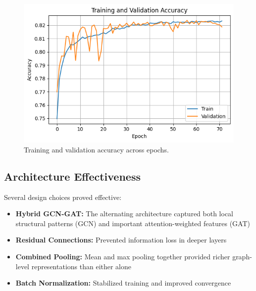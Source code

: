 \begin{figure}[t]
	\centering
	\includegraphics[width=\linewidth]{../model/logs/training_accuracy.png}
	\caption{Training and validation accuracy across epochs.}
	\label{fig:training-accuracy}
\end{figure}

\subsection{Architecture Effectiveness}

Several design choices proved effective:
\begin{itemize}
\item \textbf{Hybrid GCN-GAT:} The alternating architecture captured both local structural patterns (GCN) and important attention-weighted features (GAT)
\item \textbf{Residual Connections:} Prevented information loss in deeper layers
\item \textbf{Combined Pooling:} Mean and max pooling together provided richer graph-level representations than either alone
\item \textbf{Batch Normalization:} Stabilized training and improved convergence
\end{itemize}

